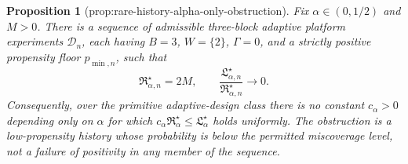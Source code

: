 \documentclass{article}
\newtheorem{proposition}{Proposition}
\begin{document}
\begin{proposition}[prop:rare-history-alpha-only-obstruction]\label{prop:rare-history-alpha-only-obstruction}
Fix \(\alpha\in(0,1/2)\) and \(M>0\).  There is a sequence of admissible three-block adaptive platform experiments \(\mathcal D_n\), each having \(B=3\), \(W=\{2\}\), \(\Gamma=0\), and a strictly positive propensity floor \(p_{\min,n}\), such that
\[
 \mathfrak R_{\alpha,n}^\star=2M,
 \qquad
 \frac{\mathfrak L_{\alpha,n}^\star}
      {\mathfrak R_{\alpha,n}^\star}\longrightarrow0.
\]
Consequently, over the primitive adaptive-design class there is no constant \(c_\alpha>0\) depending only on \(\alpha\) for which \(c_\alpha\mathfrak R_\alpha^\star\le\mathfrak L_\alpha^\star\) holds uniformly.  The obstruction is a low-propensity history whose probability is below the permitted miscoverage level, not a failure of positivity in any member of the sequence.
\end{proposition}
\end{document}
